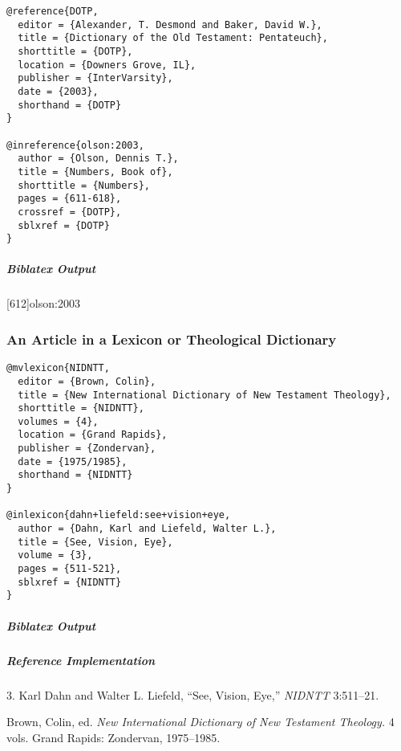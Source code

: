 \documentclass[a4paper]{article}
\newenvironment{biboutput}{%
  \subparagraph{Biblatex Output}
}{\color{black}}
\newenvironment{refimp}{%
  \subparagraph{Reference Implementation}
  \color{reference-colour}
  \rm
}{\par\color{black}}
\begin{document}
\begin{lstlisting}
@reference{DOTP,
  editor = {Alexander, T. Desmond and Baker, David W.},
  title = {Dictionary of the Old Testament: Pentateuch},
  shorttitle = {DOTP},
  location = {Downers Grove, IL},
  publisher = {InterVarsity},
  date = {2003},
  shorthand = {DOTP}
}

@inreference{olson:2003,
  author = {Olson, Dennis T.},
  title = {Numbers, Book of},
  shorttitle = {Numbers},
  pages = {611-618},
  crossref = {DOTP},
  sblxref = {DOTP}
}
\end{lstlisting}  

\begin{biboutput}
  [612]{olson:2003}
\end{biboutput}

\subsubsection{An Article in a Lexicon or Theological Dictionary}

\begin{lstlisting}
@mvlexicon{NIDNTT,
  editor = {Brown, Colin},
  title = {New International Dictionary of New Testament Theology},
  shorttitle = {NIDNTT},
  volumes = {4},
  location = {Grand Rapids},
  publisher = {Zondervan},
  date = {1975/1985},
  shorthand = {NIDNTT}
}

@inlexicon{dahn+liefeld:see+vision+eye,
  author = {Dahn, Karl and Liefeld, Walter L.},
  title = {See, Vision, Eye},
  volume = {3},
  pages = {511-521},
  sblxref = {NIDNTT}
}
\end{lstlisting}

\begin{biboutput}
\end{biboutput}

\begin{refimp}
  \hspace*{\bibindent}3. Karl Dahn and Walter L. Liefeld, “See, Vision, Eye,”
  \emph{NIDNTT} 3:511–21.

  \hangindent\bibindent Brown, Colin, ed. \emph{New International Dictionary
  of New Testament Theology.} 4 vols. Grand Rapids: Zondervan, 1975–1985.

\end{refimp}
\end{document}
